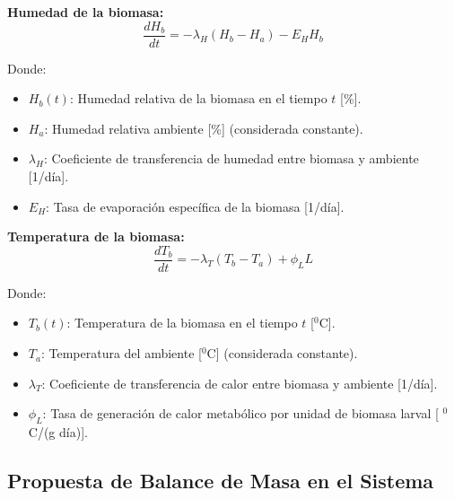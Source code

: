 \textbf{Humedad de la biomasa:}
\begin{equation}
\frac{dH_b}{dt} = -\lambda_H (H_b - H_a) - E_H H_b
\end{equation}

Donde:
\begin{itemize}
    \item $H_b(t)$: Humedad relativa de la biomasa en el tiempo $t$ [\%].
    \item $H_a$: Humedad relativa ambiente [\%] (considerada constante).
    \item $\lambda_H$: Coeficiente de transferencia de humedad entre biomasa y ambiente [1/d\'ia].
    \item $E_H$: Tasa de evaporaci\'on espec\'ifica de la biomasa [1/d\'ia].
\end{itemize}

\textbf{Temperatura de la biomasa:}
\begin{equation}
\frac{dT_b}{dt} = -\lambda_T (T_b - T_a) + \phi_L L
\end{equation}

Donde:
\begin{itemize}
    \item $T_b(t)$: Temperatura de la biomasa en el tiempo $t$ [$^0$C].
    \item $T_a$: Temperatura del ambiente [$^0$C] (considerada constante).
    \item $\lambda_T$: Coeficiente de transferencia de calor entre biomasa y ambiente [1/d\'ia].
    \item $\phi_L$: Tasa de generaci\'on de calor metab\'olico por unidad de biomasa larval [ $^0$C/(g d\'ia)].
\end{itemize}


\subsection{Propuesta de Balance de Masa en el Sistema}


